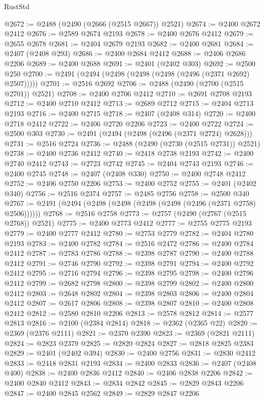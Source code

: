 \begin{lexlean}{RustStd}
\begin{coremodule}
{\begin{coremodule}
{{{{{{{{{{{{{{{{{{{{{{{{{{{{{{{{{{{{{{{{{{{{{{{{{{@2672 := @2488 (@2490 (@2666 (@2515 @2667)) @2521)
@2674 := @2400 @2672 @2412
@2676 := @2589 @2674 @2193
@2678 := @2400 @2676 @2412
@2679 := @2655 @2678
@2681 := @2404 @2679 @2193
@2682 := @2400 @2681
@2684 := @2407 (@2408 @293)
@2686 := @2400 @2684 @2412
@2688 := @2406 @2686 @2206
@2689 := @2400 @2688
@2691 := @2401 (@2402 @303)
@2692 := @2500 @250
@2700 := @2491 (@2494 (@2498 (@2498 (@2498 (@2496 (@2371 @2692) @2507)))))
@2701 := @2516 @2692
@2706 := @2488 (@2490 (@2700 (@2515 @2701)) @2521)
@2708 := @2400 @2706 @2412
@2710 := @2691 @2708 @2193
@2712 := @2400 @2710 @2412
@2713 := @2689 @2712
@2715 := @2404 @2713 @2193
@2716 := @2400 @2715
@2718 := @2407 (@2408 @314)
@2720 := @2400 @2718 @2412
@2722 := @2406 @2720 @2206
@2723 := @2400 @2722
@2724 := @2500 @303
@2730 := @2491 (@2494 (@2498 (@2496 (@2371 @2724) @2628)))
@2731 := @2516 @2724
@2736 := @2488 (@2490 (@2730 (@2515 @2731)) @2521)
@2738 := @2400 @2736 @2412
@2740 := @2418 @2738 @2193
@2742 := @2400 @2740 @2412
@2743 := @2723 @2742
@2745 := @2404 @2743 @2193
@2746 := @2400 @2745
@2748 := @2407 (@2408 @330)
@2750 := @2400 @2748 @2412
@2752 := @2406 @2750 @2206
@2753 := @2400 @2752
@2755 := @2401 (@2402 @340)
@2756 := @2516 @2374
@2757 := @2485 @2756
@2758 := @2500 @340
@2767 := @2491 (@2494 (@2498 (@2498 (@2498 (@2498 (@2496 (@2371 @2758) @2506))))))
@2768 := @2516 @2758
@2773 := @2757 (@2490 (@2767 (@2515 @2768)) @2521)
@2775 := @2400 @2773 @2412
@2777 := @2755 @2775 @2193
@2779 := @2400 @2777 @2412
@2780 := @2753 @2779
@2782 := @2404 @2780 @2193
@2783 := @2400 @2782
@2784 := @2516 @2472
@2786 := @2400 @2784 @2412
@2787 := @2783 @2786
@2788 := @2398 @2787
@2790 := @2400 @2788 @2412
@2791 := @2746 @2790
@2792 := @2398 @2791
@2794 := @2400 @2792 @2412
@2795 := @2716 @2794
@2796 := @2398 @2795
@2798 := @2400 @2796 @2412
@2799 := @2682 @2798
@2800 := @2398 @2799
@2802 := @2400 @2800 @2412
@2803 := @2648 @2802
@2804 := @2398 @2803
@2806 := @2400 @2804 @2412
@2807 := @2617 @2806
@2808 := @2398 @2807
@2810 := @2400 @2808 @2412
@2812 := @2580 @2810 @2206
@2813 := @2578 @2812
@2814 := @2577 @2813
@2816 := @2100 (@2384 @2814)
@2818 := @2362 (@2365 @22)
@2820 := @2369 (@2376 @2111)
@2821 := @2370 @2390
@2823 := @2369 (@2821 @2111)
@2824 := @2823 @2379
@2825 := @2820 @2824
@2827 := @2818 @2825 @2383
@2829 := @2401 (@2402 @394)
@2830 := @2400 @2756
@2831 := @2830 @2412
@2833 := @2418 @2831 @2193
@2834 := @2400 @2833
@2836 := @2407 (@2408 @400)
@2838 := @2400 @2836 @2412
@2840 := @2406 @2838 @2206
@2842 := @2400 @2840 @2412
@2843 := @2834 @2842
@2845 := @2829 @2843 @2206
@2847 := @2400 @2845 @2562
@2849 := @2829 @2847 @2206
}}}}}}}}}}}}}}}}}}}}}}}}}}}}}}}}}}}}}}}}}}}}}}}}}}
\end{coremodule}}
\end{coremodule}
\end{lexlean}
